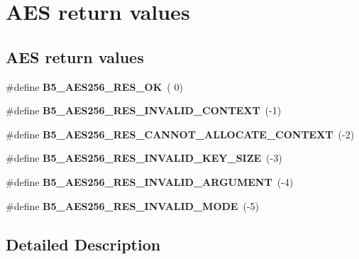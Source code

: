 \hypertarget{group__aes_return}{\section{A\-E\-S return values}
\label{group__aes_return}
}
\subsection*{A\-E\-S return values}
\begin{DoxyCompactItemize}
\item 
\hypertarget{group__aes_return_ga00ffcdf1f612771e50746a698b5b1c74}{\#define {\bfseries B5\-\_\-\-A\-E\-S256\-\_\-\-R\-E\-S\-\_\-\-O\-K}~( 0)}\label{group__aes_return_ga00ffcdf1f612771e50746a698b5b1c74}

\item 
\hypertarget{group__aes_return_ga0f56c14cc394a1022d48a74f2ae92d3a}{\#define {\bfseries B5\-\_\-\-A\-E\-S256\-\_\-\-R\-E\-S\-\_\-\-I\-N\-V\-A\-L\-I\-D\-\_\-\-C\-O\-N\-T\-E\-X\-T}~(-\/1)}\label{group__aes_return_ga0f56c14cc394a1022d48a74f2ae92d3a}

\item 
\hypertarget{group__aes_return_ga3aec4b8145ea7932bf9811a3f0b4e652}{\#define {\bfseries B5\-\_\-\-A\-E\-S256\-\_\-\-R\-E\-S\-\_\-\-C\-A\-N\-N\-O\-T\-\_\-\-A\-L\-L\-O\-C\-A\-T\-E\-\_\-\-C\-O\-N\-T\-E\-X\-T}~(-\/2)}\label{group__aes_return_ga3aec4b8145ea7932bf9811a3f0b4e652}

\item 
\hypertarget{group__aes_return_ga936c253f0e3f957d5513107d9ec9e043}{\#define {\bfseries B5\-\_\-\-A\-E\-S256\-\_\-\-R\-E\-S\-\_\-\-I\-N\-V\-A\-L\-I\-D\-\_\-\-K\-E\-Y\-\_\-\-S\-I\-Z\-E}~(-\/3)}\label{group__aes_return_ga936c253f0e3f957d5513107d9ec9e043}

\item 
\hypertarget{group__aes_return_ga7986201f27d74baad93d452149a8c642}{\#define {\bfseries B5\-\_\-\-A\-E\-S256\-\_\-\-R\-E\-S\-\_\-\-I\-N\-V\-A\-L\-I\-D\-\_\-\-A\-R\-G\-U\-M\-E\-N\-T}~(-\/4)}\label{group__aes_return_ga7986201f27d74baad93d452149a8c642}

\item 
\hypertarget{group__aes_return_ga9b1fbd9617ea5eeebf71eeadff455ec5}{\#define {\bfseries B5\-\_\-\-A\-E\-S256\-\_\-\-R\-E\-S\-\_\-\-I\-N\-V\-A\-L\-I\-D\-\_\-\-M\-O\-D\-E}~(-\/5)}\label{group__aes_return_ga9b1fbd9617ea5eeebf71eeadff455ec5}

\end{DoxyCompactItemize}


\subsection{Detailed Description}
